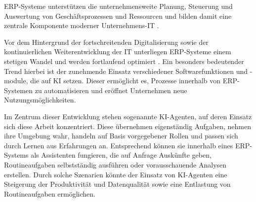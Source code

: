 \ac{ERP}-Systeme unterstützen die unternehmensweite Planung, Steuerung und Auswertung von Geschäftsprozessen und Ressourcen und bilden damit eine zentrale Komponente moderner Unternehmens-IT \cite[]{nickel_wie_2020}.

Vor dem Hintergrund der fortschreitenden Digitalisierung sowie der kontinuierlichen Weiterentwicklung der IT unterliegen \ac{ERP}-Systeme einem stetigen Wandel und werden fortlaufend optimiert \cite[]{hrischev_artificial_2023}. Ein besonders bedeutender Trend hierbei ist der zunehmende Einsatz verschiedener Softwarefunktionen und -module, die auf \ac{KI} setzen. Dieser ermöglicht es, Prozesse innerhalb von \ac{ERP}-Systemen zu automatisieren und eröffnet Unternehmen neue Nutzungsmöglichkeiten. \cite[\pagef 6ff]{hrischev_artificial_2023}

Im Zentrum dieser Entwicklung stehen sogenannte \ac{KI}-Agenten, auf deren Einsatz sich diese Arbeit konzentriert. Diese übernehmen eigenständig Aufgaben, nehmen ihre Umgebung wahr, handeln auf Basis vorgegebener Rollen und passen sich durch Lernen aus Erfahrungen an. \cite[]{deng_ai_2025} Entsprechend können sie innerhalb eines \ac{ERP}-Systems als Assistenten fungieren, die auf Anfrage Auskünfte geben, Routineaufgaben selbstständig ausführen oder vorausschauende Analysen erstellen. Durch solche Szenarien könnte der Einsatz von \ac{KI}-Agenten eine Steigerung der Produktivität und Datenqualität sowie eine Entlastung von Routineaufgaben ermöglichen. \cite[]{gujar_role_2025}